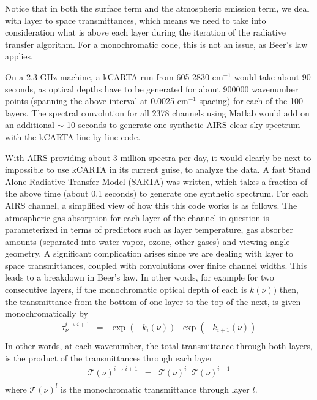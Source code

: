 \documentclass[11pt]{article}
\newcommand{\kc}{\textsf{kCARTA}\xspace}
\newcommand{\wn}{cm$^{-1}$\xspace}
\begin{document}
Notice that in both the surface term and the atmospheric emission
term, we deal with layer to space transmittances, which means we need
to take into consideration what is above each layer during the
iteration of the radiative transfer algorithm. For a monochromatic
code, this is not an issue, as Beer's law applies.

On a 2.3 GHz machine, a \kc run from 605-2830 \wn would take about 90
seconds, as optical depths have to be generated for about 900000
wavenumber points (spanning the above interval at 0.0025 \wn spacing)
for each of the 100 layers. The spectral convolution for all 2378
channels using Matlab would add on an additional $\sim$ 10 seconds to
generate one synthetic AIRS clear sky spectrum with the \kc
line-by-line code.

With AIRS providing about 3 million spectra per day, it would clearly
be next to impossible to use \kc in its current guise, to analyze the
data. A fast Stand Alone Radiative Transfer Model (SARTA) was written,
which takes a fraction of the above time (about 0.1 seconds) to
generate one synthetic spectrum. For each AIRS channel, a simplified
view of how this this code works is as follows. The atmospheric gas
absorption for
each layer of the channel in question is parameterized in terms of
predictors such as layer temperature, gas absorber amounts (separated
into water vapor, ozone, other gases) and viewing angle geometry. A
significant complication arises since we are dealing with layer to
space transmittances, coupled with convolutions over finite channel
widths. This leads to a breakdown in Beer's law. In other words, for
example for two consecutive layers, if the monochromatic optical depth
of each is $k(\nu))$ then, the transmittance from the bottom of one
layer to the top of the next, is given monochromatically by
\begin{eqnarray*}
  \tau_{\nu}^{i \rightarrow i+1} & = & \exp(-k_{i}(\nu)) \;\; \exp(-k_{i+1}(\nu)) \\
\end{eqnarray*}
In other words, at each wavenumber, the total transmittance through
both layers, is the product of the transmittances through each layer
\begin{eqnarray*}
  \mathcal{T}(\nu)^{i \rightarrow i+1}           & = &  \mathcal{T}(\nu)^{i} \;\;  \mathcal{T}(\nu)^{i+1}\\
\end{eqnarray*}
where $\mathcal{T}(\nu)^{l}$ is the monochromatic transmittance
through layer $l$.
\end{document}
